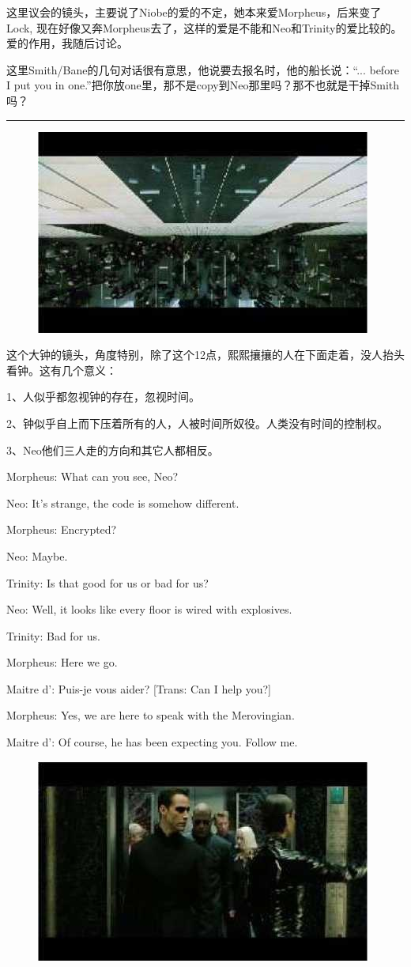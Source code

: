\documentclass[UTF8]{ctexart}
\newcommand{\myparsep}{\noindent \rule[0.5ex]{\linewidth}{1pt}}
\newenvironment{myquote}{\color{green} \setlength{\leftskip}{6em} \setlength{\rightskip}{4em} \setlength{\parindent}{-2em}}{\par}
\begin{document}
这里议会的镜头，主要说了Niobe的爱的不定，她本来爱Morpheus，后来变了Lock, 现在好像又奔Morpheus去了，这样的爱是不能和Neo和Trinity的爱比较的。爱的作用，我随后讨论。

这里Smith/Bane的几句对话很有意思，他说要去报名时，他的船长说：“... before I put you in one.”把你放one里，那不是copy到Neo那里吗？那不也就是干掉Smith吗？

\myparsep

\begin{figure}[htb]
\centering
\includegraphics[width=0.5\linewidth]{fig/read_reloaded-86}
\end{figure}

这个大钟的镜头，角度特别，除了这个12点，熙熙攘攘的人在下面走着，没人抬头看钟。这有几个意义：

1、人似乎都忽视钟的存在，忽视时间。

2、钟似乎自上而下压着所有的人，人被时间所奴役。人类没有时间的控制权。

3、Neo他们三人走的方向和其它人都相反。

\begin{myquote}
Morpheus: What can you see, Neo?

Neo: It's strange, the code is somehow different.

Morpheus: Encrypted?

Neo: Maybe.

Trinity: Is that good for us or bad for us?

Neo: Well, it looks like every floor is wired with explosives.

Trinity: Bad for us.

Morpheus: Here we go.

Maitre d': Puis-je vous aider? [Trans: Can I help you?]

Morpheus: Yes, we are here to speak with the Merovingian.

Maitre d': Of course, he has been expecting you. Follow me.
\end{myquote}

\begin{figure}[htb]
\centering
\includegraphics[width=0.5\linewidth]{fig/read_reloaded-87}
\end{figure}
\end{document}
